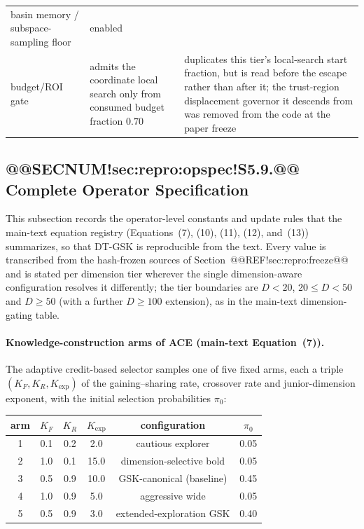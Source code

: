 \documentclass[10pt,a4paper]{article}
\newcommand{\dtgsk}{DT-GSK}
\begin{document}
\begin{table}[H]
\begin{tabular}{p{2.9cm} p{5.8cm} p{4.8cm}}
basin memory / subspace-sampling floor & enabled & \\
budget/ROI gate & admits the coordinate local search only from consumed budget fraction $0.70$ & duplicates this tier's local-search start fraction, but is read before the escape rather than after it; the trust-region displacement governor it descends from was removed from the code at the paper freeze\\
\bottomrule
\end{tabular}
\end{table}




\subsection{@@SECNUM!sec:repro:opspec!S5.9.@@ Complete Operator Specification}\label{sec:repro:opspec}

This subsection records the operator-level constants and update rules that the
main-text equation registry (Equations~(7), (10), (11), (12), and~(13)) summarizes, so
that \dtgsk{} is reproducible from the text.  Every value is transcribed from
the hash-frozen sources of Section~@@REF!sec:repro:freeze@@ and is stated per
dimension tier wherever the single dimension-aware configuration resolves it
differently; the tier boundaries are $D<20$, $20\le D<50$ and $D\ge 50$ (with a
further $D\ge 100$ extension), as in the main-text dimension-gating table.


\paragraph{Knowledge-construction arms of ACE (main-text Equation~(7)).}
The adaptive credit-based selector samples one of five fixed arms, each a triple
$(K_F, K_R, K_{\exp})$ of the gaining--sharing rate, crossover rate and
junior-dimension exponent, with the initial selection probabilities $\pi_0$:
\begin{center}
\small
\begin{tabular}{cccccc}
\toprule
arm & $K_F$ & $K_R$ & $K_{\exp}$ & configuration & $\pi_0$\\
\midrule
1 & 0.1 & 0.2 & 2.0  & cautious explorer            & 0.05\\
2 & 1.0 & 0.1 & 15.0 & dimension-selective bold     & 0.05\\
3 & 0.5 & 0.9 & 10.0 & GSK-canonical (baseline)     & 0.45\\
4 & 1.0 & 0.9 & 5.0  & aggressive wide              & 0.05\\
5 & 0.5 & 0.9 & 3.0  & extended-exploration GSK     & 0.40\\
\bottomrule
\end{tabular}
\end{center}
\end{document}
